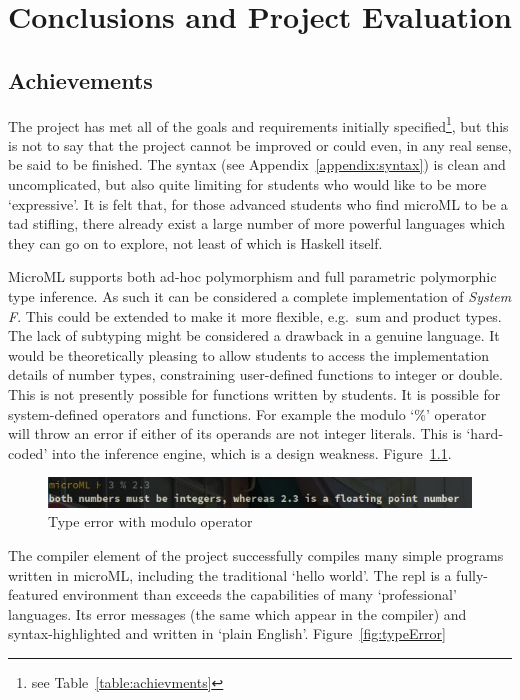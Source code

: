\documentclass[12pt, a4paper]{report}
\begin{document}
\chapter{Conclusions and Project Evaluation}

\section{Achievements}
The project has met all of the goals and requirements initially specified\footnote{see
Table~\ref{table:achievments}}, but this is not to say
that the project cannot be improved or could even, in any real sense, be said to be finished. The
syntax (see Appendix~\ref{appendix:syntax}) is clean and uncomplicated, but also quite limiting for
students who would like to be more `expressive'. It is felt that, for those advanced students who
find microML to be a tad stifling, there already exist a large number of more powerful languages
which they can go on to explore, not least of which is Haskell itself. 

MicroML supports both ad-hoc polymorphism and full parametric polymorphic type inference. As such
it can be considered a complete implementation of \textit{System F}. This could be extended to
make it more flexible, e.g.\ sum and product types. The lack of subtyping might be considered a
drawback in a genuine language. It would be theoretically pleasing to allow students to access the
implementation details of number types, constraining user-defined functions to integer or double.
This is not presently possible for functions written by students. It is possible for
system-defined operators and functions. For example the modulo `\%' operator will throw an error
if either of its operands are not integer literals. This is `hard-coded' into the inference engine,
which is a design weakness. Figure~\ref{fig:modulo}.

\begin{figure}
    \includegraphics[width=\textwidth]{images/modulo.jpg}
    \caption{Type error with modulo operator}
\label{fig:modulo}
\end{figure}

The compiler element of the project successfully compiles many simple programs written in microML,
including the traditional `hello world'. The repl is a fully-featured environment than exceeds the
capabilities of many `professional' languages. Its error messages (the same which appear in the
compiler) and syntax-highlighted and written in `plain English'. Figure~\ref{fig:typeError}
\end{document}
